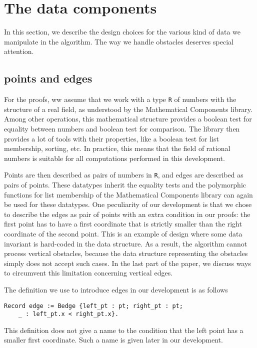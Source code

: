 \documentclass[a4paper, USenglish, cleveref, autoref, thm-restate]{lipics-v2021}
\begin{document}
\section{The data components}
In this section, we describe the design choices for the various kind
of data we manipulate in the algorithm.  The way we handle obstacles
deserves special attention.
\subsection{points and edges}

For the proofs, ww assume that we work with a type {\tt R} of numbers
with the structure of a real field, as understood by the
{\sc Mathematical Components} library.  Among other operations, this
mathematical structure provides a boolean test for equality between
numbers and boolean test for comparison.  The library then provides a
lot of tools with their properties, like a boolean test for list
membership, sorting, etc.  In practice, this means that
the field of rational numbers is suitable for all computations
performed in this development.

Points are then described as pairs of numbers in {\tt R}, and edges
are described as pairs of points.  These datatypes inherit the
equality tests and the polymorphic functions for list membership of
the {\sc Mathematical Components} library can again be used for these
datatypes.  One peculiarity of our development
is that we chose to describe the edges as pair of points with an extra
condition in our proofs: the first point has to have a first
coordinate that is strictly smaller than the right coordinate of the
second point.  This is an example of design where some data invariant
is hard-coded in the data structure.  As a result, the algorithm
cannot process vertical obstacles, because the data structure
representing the obstacles simply does not accept such cases.  In the
last part of the paper, we discuss ways to circumvent this limitation
concerning vertical edges.

The definition we use to introduce edges in our development is as
follows
\begin{verbatim}
Record edge := Bedge {left_pt : pt; right_pt : pt;
    _ : left_pt.x < right_pt.x}.
\end{verbatim}
This definition does not give a name to the condition that the left
point has a smaller first coordinate.  Such a name is given later in
our development.
\end{document}
